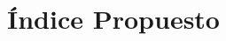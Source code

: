 \label{chap:index}

\section{\'{I}ndice Propuesto}
{
\renewcommand{\labelenumi}{\arabic{enumi}.}
\renewcommand{\labelenumii}{\arabic{enumi}.\arabic{enumii}}
\renewcommand{\labelenumiii}{\arabic{enumi}.\arabic{enumii}.\arabic{enumiii}}
\renewcommand{\labelenumiv}{\arabic{enumi}.\arabic{enumii}.\arabic{enumiii}.\arabic{enumiv}}


}
